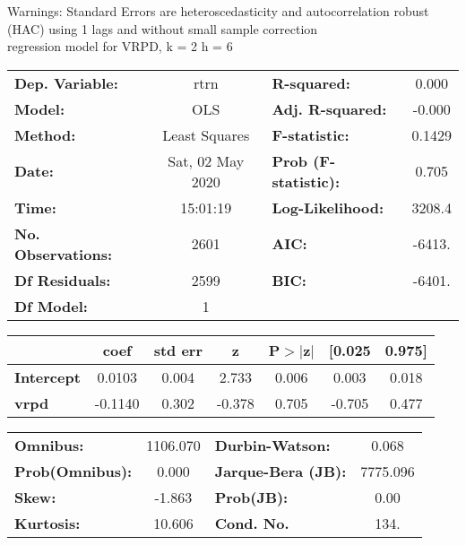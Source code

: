 Warnings: \newline
 [1] Standard Errors are heteroscedasticity and autocorrelation robust (HAC) using 1 lags and without small sample correction\\ 

regression model for VRPD, k = 2 h = 6\begin{center}
\begin{tabular}{lclc}
\toprule
\textbf{Dep. Variable:}    &       rtrn       & \textbf{  R-squared:         } &     0.000   \\
\textbf{Model:}            &       OLS        & \textbf{  Adj. R-squared:    } &    -0.000   \\
\textbf{Method:}           &  Least Squares   & \textbf{  F-statistic:       } &    0.1429   \\
\textbf{Date:}             & Sat, 02 May 2020 & \textbf{  Prob (F-statistic):} &    0.705    \\
\textbf{Time:}             &     15:01:19     & \textbf{  Log-Likelihood:    } &    3208.4   \\
\textbf{No. Observations:} &        2601      & \textbf{  AIC:               } &    -6413.   \\
\textbf{Df Residuals:}     &        2599      & \textbf{  BIC:               } &    -6401.   \\
\textbf{Df Model:}         &           1      & \textbf{                     } &             \\
\bottomrule
\end{tabular}
\begin{tabular}{lcccccc}
                   & \textbf{coef} & \textbf{std err} & \textbf{z} & \textbf{P$> |$z$|$} & \textbf{[0.025} & \textbf{0.975]}  \\
\midrule
\textbf{Intercept} &       0.0103  &        0.004     &     2.733  &         0.006        &        0.003    &        0.018     \\
\textbf{vrpd}      &      -0.1140  &        0.302     &    -0.378  &         0.705        &       -0.705    &        0.477     \\
\bottomrule
\end{tabular}
\begin{tabular}{lclc}
\textbf{Omnibus:}       & 1106.070 & \textbf{  Durbin-Watson:     } &    0.068  \\
\textbf{Prob(Omnibus):} &   0.000  & \textbf{  Jarque-Bera (JB):  } & 7775.096  \\
\textbf{Skew:}          &  -1.863  & \textbf{  Prob(JB):          } &     0.00  \\
\textbf{Kurtosis:}      &  10.606  & \textbf{  Cond. No.          } &     134.  \\
\bottomrule
\end{tabular}
\end{center}

